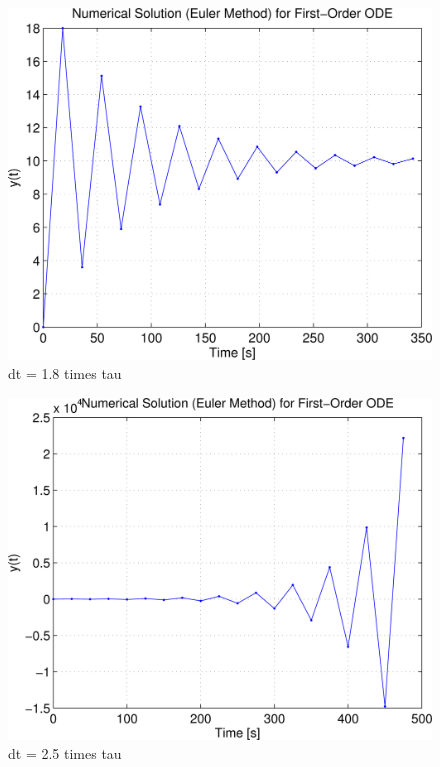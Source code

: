 \begin{figure}[hbt]
\centering
\includegraphics[width=\FigWidth\textwidth]{../code/firstorder_euler_soln.png}
\caption{dt = 1.8 times tau}
\label{f:euler_soln1}
\end{figure}

\begin{figure}[hbt]
\centering
\includegraphics[width=\FigWidth\textwidth]{../code/firstorder_euler_soln2.png}
\caption{dt = 2.5 times tau}
\label{f:euler_soln2}
\end{figure}

